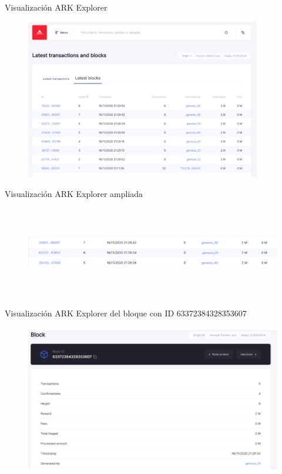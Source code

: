 \documentclass[10pt,aspectratio=169,]{beamer}
\begin{document}
\begin{frame}[c]{Visualización ARK Explorer}
	\begin{figure}
		\centering
		\includegraphics[height=7cm]{explorer_2.png}
	\end{figure}
\end{frame}

\begin{frame}[c]{Visualización ARK Explorer ampliada}
	\begin{figure}
		\centering
		\includegraphics[height=4cm]{explorer_3.png}
	\end{figure}
\end{frame}

\begin{frame}[c]{Visualización ARK Explorer del bloque con ID 63372384328353607}
	\begin{figure}
		\centering
		\includegraphics[height=6.5cm]{explorer_4.png}
	\end{figure}
\end{frame}
\end{document}

